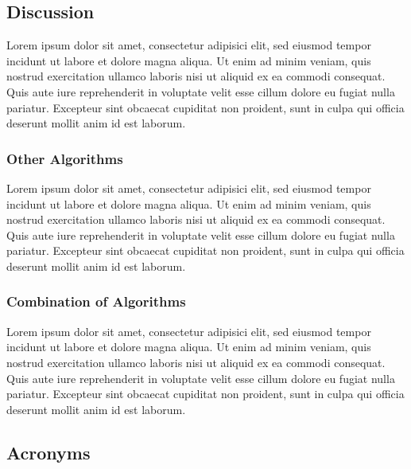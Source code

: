 % 


\subsection{Discussion}
\label{sec:Discussion}

Lorem ipsum dolor sit amet, consectetur adipisici elit, sed eiusmod tempor incidunt ut labore et dolore magna aliqua. Ut enim ad minim veniam, quis nostrud exercitation ullamco laboris nisi ut aliquid ex ea commodi consequat. Quis aute iure reprehenderit in voluptate velit esse cillum dolore eu fugiat nulla pariatur. Excepteur sint obcaecat cupiditat non proident, sunt in culpa qui officia deserunt mollit anim id est laborum.

\subsubsection{Other Algorithms}
\label{sec:Listings}

Lorem ipsum dolor sit amet, consectetur adipisici elit, sed eiusmod tempor incidunt ut labore et dolore magna aliqua. Ut enim ad minim veniam, quis nostrud exercitation ullamco laboris nisi ut aliquid ex ea commodi consequat. Quis aute iure reprehenderit in voluptate velit esse cillum dolore eu fugiat nulla pariatur. Excepteur sint obcaecat cupiditat non proident, sunt in culpa qui officia deserunt mollit anim id est laborum.


\subsubsection{Combination of Algorithms}
\label{sec:Listings}

Lorem ipsum dolor sit amet, consectetur adipisici elit, sed eiusmod tempor incidunt ut labore et dolore magna aliqua. Ut enim ad minim veniam, quis nostrud exercitation ullamco laboris nisi ut aliquid ex ea commodi consequat. Quis aute iure reprehenderit in voluptate velit esse cillum dolore eu fugiat nulla pariatur. Excepteur sint obcaecat cupiditat non proident, sunt in culpa qui officia deserunt mollit anim id est laborum.


\subsection{Acronyms}
\label{sec:Acronyms}


